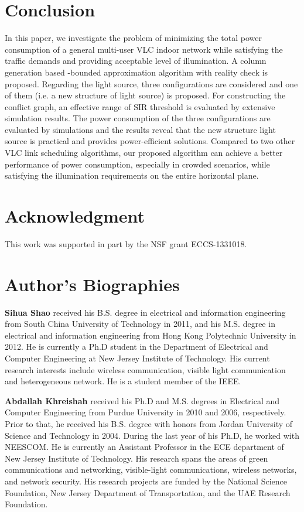 \documentclass[10pt,journal]{IEEEtran}
\begin{document}
\section{Conclusion}\label{conclusion}
In this paper, we investigate the problem of minimizing the total power consumption of a general multi-user VLC indoor network while satisfying the traffic demands and providing acceptable level of illumination. A column generation based -bounded approximation algorithm with reality check is proposed. Regarding the light source, three configurations are considered and one of them (i.e. a new structure of light source) is proposed. For constructing the conflict graph, an effective range of SIR threshold is evaluated by extensive simulation results. The power consumption of the three configurations are evaluated by simulations and the results reveal that the new structure light source is practical and provides power-efficient solutions. Compared to two other VLC link scheduling algorithms, our proposed algorithm can achieve a better performance of power consumption, especially in crowded scenarios, while satisfying the illumination requirements on the entire horizontal plane.

\section*{Acknowledgment}
This work was supported in part by the NSF grant ECCS-1331018.




\section*{Author's Biographies}
\textbf{Sihua Shao} received his B.S. degree in electrical and information engineering from South China University of Technology in 2011, and his M.S. degree in electrical and information engineering from Hong Kong Polytechnic University in 2012. He is currently a Ph.D student in the Department of Electrical and Computer Engineering at New Jersey Institute of Technology. His current research interests include wireless communication, visible light communication and heterogeneous network. He is a student member of the IEEE.

\textbf{Abdallah Khreishah} received his Ph.D and M.S. degrees in Electrical and Computer Engineering from Purdue University in 2010 and 2006, respectively. Prior to that, he received his B.S. degree with honors from Jordan University of Science and Technology in 2004. During the last year of his Ph.D, he worked with NEESCOM. He is currently an Assistant Professor in the ECE department of New Jersey Institute of Technology. His research spans the areas of green communications and networking, visible-light communications, wireless networks, and network security. His research projects are funded by the National Science Foundation, New Jersey Department of Transportation, and the UAE Research Foundation.
\end{document}

